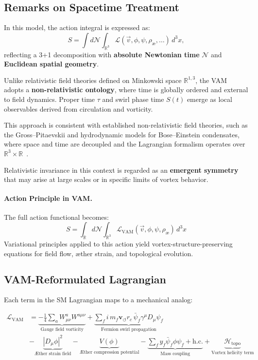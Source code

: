 \documentclass[12pt]{article}
\begin{document}
\subsection*{Remarks on Spacetime Treatment}
In this model, the action integral is expressed as:
\[
    S = \int d\mathcal{N} \int_{\mathbb{R}^3} \mathcal{L}(\vec{v}, \phi, \psi, \rho_\text{\ae}, \dots) \, d^3x,
\]
reflecting a 3+1 decomposition with \textbf{absolute Newtonian time} \( \mathcal{N} \) and \textbf{Euclidean spatial geometry}.

Unlike relativistic field theories defined on Minkowski space \( \mathbb{R}^{1,3} \), the VAM adopts a \textbf{non-relativistic ontology}, where time is globally ordered and external to field dynamics. Proper time \( \tau \) and swirl phase time \( S(t) \) emerge as local observables derived from circulation and vorticity.

This approach is consistent with established non-relativistic field theories, such as the Gross--Pitaevskii and hydrodynamic models for Bose--Einstein condensates, where space and time are decoupled and the Lagrangian formalism operates over \( \mathbb{R}^3 \times \mathbb{R} \)~\cite{Pethick2008BEC}.

Relativistic invariance in this context is regarded as an \textbf{emergent symmetry} that may arise at large scales or in specific limits of vortex behavior.

\paragraph{Action Principle in VAM.}
The full action functional becomes:
\[
S = \int_{\mathbb{R}} d\mathcal{N} \int_{\mathbb{R}^3} \mathcal{L}_{\text{VAM}}(\vec{v}, \phi, \psi, \rho_\text{\ae}) \, d^3x
\]
Variational principles applied to this action yield vortex-structure-preserving equations for field flow, \ae{}ther strain, and topological evolution.

\subsection{VAM-Reformulated Lagrangian}
Each term in the SM Lagrangian maps to a mechanical analog:

\begin{align*}
    \mathcal{L}_\text{VAM} &= \underbrace{-\frac{1}{4} \sum_{a} W^{a}_{\mu\nu} W^{a\mu\nu}}_{\text{Gauge field vorticity}}
    + \underbrace{\sum_{f} i \, m_f \mathbf{v}_{\scriptscriptstyle\boldsymbol{\circlearrowleft}} r_c \, \bar{\psi}_f \gamma^\mu D_\mu \psi_f}_{\text{Fermion swirl propagation}} \\
    &- \underbrace{|D_\mu \phi|^2}_{\text{\AE{}ther strain field}}
    - \underbrace{V(\phi)}_{\text{\AE{}ther compression potential}}
    - \underbrace{\sum_f y_f \bar{\psi}_f \phi \psi_f + \text{h.c.}}_{\text{Mass coupling}}
    + \underbrace{\mathcal{H}_\text{topo}}_{\text{Vortex helicity term}}
\end{align*}
\end{document}
